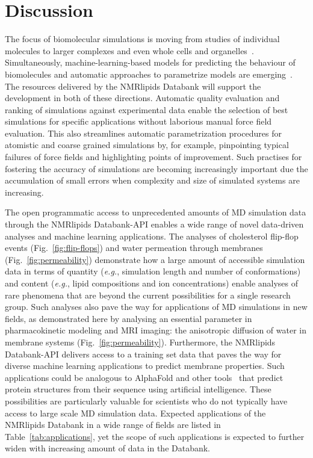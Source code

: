 \documentclass[fleqn,10pt]{wlscirep}
\begin{document}
\section{Discussion}


The focus of biomolecular simulations is moving from studies of individual molecules to larger complexes and even whole cells and organelles~\cite{johnson15,thornburg22,gupta22}. Simultaneously, machine-learning-based models for predicting the behaviour of biomolecules and automatic approaches to parametrize models are emerging~\cite{jumper21,antila22b}. The resources delivered by the NMRlipids Databank will support the development in both of these directions. Automatic quality evaluation and ranking of simulations against experimental data enable the selection of best simulations for specific applications without laborious manual force field evaluation. This also streamlines automatic parametrization procedures for atomistic and coarse grained simulations by, for example, pinpointing typical failures of force fields and highlighting points of improvement. Such practises for fostering the accuracy of simulations are becoming increasingly important due the accumulation of small errors when complexity and size of simulated systems are increasing.

The open programmatic access to unprecedented amounts of MD simulation data through the NMRlipids Databank-API enables a wide range of novel data-driven analyses and machine learning applications. The analyses of cholesterol flip-flop events (Fig.~\ref{fig:flip-flops}) and water permeation through membranes (Fig.~\ref{fig:permeability}) demonstrate how a large amount of accessible simulation data in terms of quantity (\textit{e.g.}, simulation length and number of conformations) and content (\textit{e.g.}, lipid compositions and ion concentrations) enable analyses of rare phenomena that are beyond the current possibilities for a single research group. Such analyses also pave the way for applications of MD simulations in new fields, as demonstrated here by analysing an essential parameter in pharmacokinetic modeling and MRI imaging:\cite{nitsche19,topgaard20} the anisotropic diffusion of water in membrane systems (Fig.~\ref{fig:permeability}). Furthermore, the NMRlipids Databank-API delivers access to a training set data that paves the way for diverse machine learning applications to predict membrane properties. Such applications could be analogous to AlphaFold \cite{jumper21} and other tools~\cite{baek21,lin23} that predict protein structures from their sequence using artificial intelligence. These possibilities are particularly valuable for scientists who do not typically have access to large scale MD simulation data. Expected applications of the NMRlipids Databank in a wide range of fields are listed in Table~\ref{tab:applications}, yet the scope of such applications
is expected to further widen with increasing amount of data in the Databank.  
\end{document}
